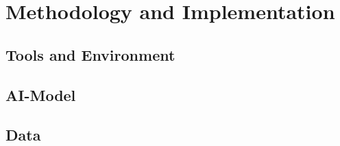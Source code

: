 \chapter{Methodology and Implementation}
\label{chap:kapitel3}



	\section{Tools and Environment}
	\label{sec:tools-and-environment}
	
	
	
	\section{AI-Model}
	\label{sec:ai-model}
	
	
	
	\section{Data}
	\label{sec:data}

